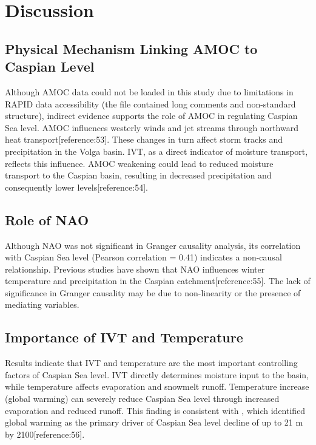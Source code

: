 \documentclass[12pt,letterpaper]{article}
\begin{document}
\section{Discussion}

\subsection{Physical Mechanism Linking AMOC to Caspian Level}

Although AMOC data could not be loaded in this study due to limitations in RAPID data accessibility (the file contained long comments and non-standard structure), indirect evidence supports the role of AMOC in regulating Caspian Sea level. AMOC influences westerly winds and jet streams through northward heat transport[reference:53]. These changes in turn affect storm tracks and precipitation in the Volga basin. IVT, as a direct indicator of moisture transport, reflects this influence. AMOC weakening could lead to reduced moisture transport to the Caspian basin, resulting in decreased precipitation and consequently lower levels[reference:54].

\subsection{Role of NAO}

Although NAO was not significant in Granger causality analysis, its correlation with Caspian Sea level (Pearson correlation = 0.41) indicates a non-causal relationship. Previous studies have shown that NAO influences winter temperature and precipitation in the Caspian catchment[reference:55]. The lack of significance in Granger causality may be due to non-linearity or the presence of mediating variables.

\subsection{Importance of IVT and Temperature}

Results indicate that IVT and temperature are the most important controlling factors of Caspian Sea level. IVT directly determines moisture input to the basin, while temperature affects evaporation and snowmelt runoff. Temperature increase (global warming) can severely reduce Caspian Sea level through increased evaporation and reduced runoff. This finding is consistent with \cite{rapiddecline2025}, which identified global warming as the primary driver of Caspian Sea level decline of up to 21 m by 2100[reference:56].
\end{document}
